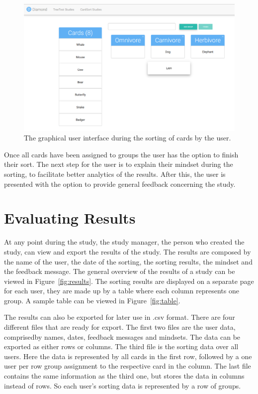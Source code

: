 \begin{figure}[tp]  \centering
\includegraphics[keepaspectratio,width=\linewidth,height=\halfh]{images/implementation/sorting.png}
\caption[Card Sorting Interface] 
{The graphical user interface during the sorting of cards by the user.
 } 
\label{fig:sorting} 
\end{figure}

Once all cards have been assigned to groups the user has the option to finish
their sort. The next step for the user is to explain their mindset during the
sorting, to facilitate better analytics of the results. After this, the user is
presented with the option to provide general feedback concerning the study.

\section{Evaluating Results}

At any point during the study, the study manager, the person who created the
study, can view and export the results of the study. The results are composed by
the name of the user, the date of the sorting, the sorting results, the mindset
and the feedback message. The general overview of the results of a study can be
viewed in Figure~\ref{fig:results}. The sorting results are displayed on a
separate page for each user, they are made up by a table where each column
represents one group. A sample table can be viewed in Figure~\ref{fig:table}.

The results can also be exported for later use in .csv format. There are four
different files that are ready for export. The first two files are the user 
data, comprisedby names, dates, feedback messages and mindsets. The data can be 
exported as either rows or columns. The third file is the sorting data over all 
users. Here the data is represented by all cards in the first row, followed by 
a one user per row group assignment to the respective card in the column. The 
last file contains the same information as the third one, but stores the data 
in columns instead of rows. So each user's sorting data is represented by a row 
of groups.

